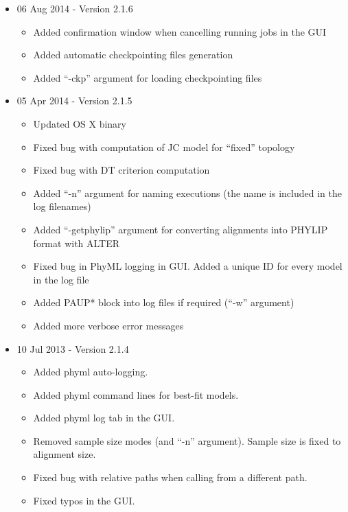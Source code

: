 \documentclass[11pt,twoside,a4paper]{article}
\begin{document}
\begin{itemize}

	\item 06 Aug 2014 - Version 2.1.6

	\begin{itemize}
		\item Added confirmation window when cancelling running jobs in the GUI
		\item Added automatic checkpointing files generation
		\item Added ``-ckp'' argument for loading checkpointing files
	\end{itemize}

	\item 05 Apr 2014 - Version 2.1.5

	\begin{itemize}
		\item Updated OS X binary
		\item Fixed bug with computation of JC model for ``fixed'' topology
		\item Fixed bug with DT criterion computation
		\item Added ``-n'' argument for naming executions (the name is included in the log filenames)
		\item Added ``-getphylip'' argument for converting alignments into PHYLIP format with ALTER
		\item Fixed bug in PhyML logging in GUI. Added a unique ID for every model in the log file
		\item Added PAUP* block into log files if required (``-w'' argument)
		\item Added more verbose error messages 
	\end{itemize}

	\item 10 Jul 2013 - Version 2.1.4

	\begin{itemize}
		\item Added phyml auto-logging.
		\item Added phyml command lines for best-fit models.
		\item Added phyml log tab in the GUI.
		\item Removed sample size modes (and ``-n'' argument). Sample size is fixed to alignment size.
		\item Fixed bug with relative paths when calling from a different path.
		\item Fixed typos in the GUI. 
	\end{itemize}


\end{itemize}
\end{document}
